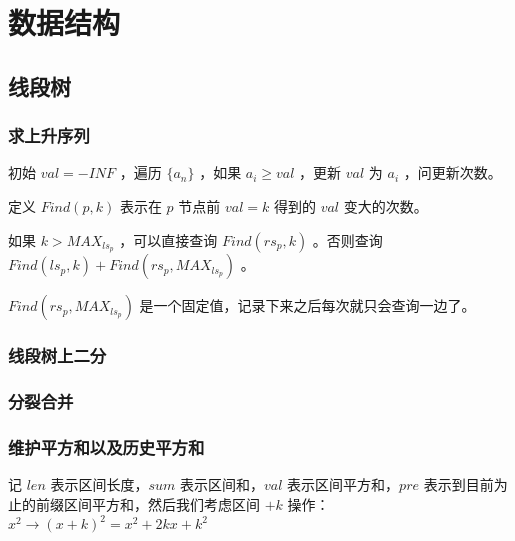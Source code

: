 \section{数据结构}


\subsection{线段树}

\subsubsection{求上升序列}

初始 $val=-INF$ ，遍历 $\{a_n\}$ ，如果 $a_i\ge val$ ，更新 $val$ 为 $a_i$ ，问更新次数。

定义 $Find(p,k)$ 表示在 $p$ 节点前 $val=k$ 得到的 $val$ 变大的次数。

如果 $k>MAX_{ls_p}$ ，可以直接查询 $Find(rs_p,k)$ 。否则查询 $Find(ls_p,k)+Find(rs_p,MAX_{ls_p})$ 。

$Find(rs_p,MAX_{ls_p})$ 是一个固定值，记录下来之后每次就只会查询一边了。



\vspace{-0.5cm}

\subsubsection{线段树上二分}

\vspace{-0.2cm}



\subsubsection{分裂合并}



\vspace{-0.3cm}

\subsubsection{维护平方和以及历史平方和}

记 $len$ 表示区间长度，$sum$ 表示区间和，$val$ 表示区间平方和，$pre$ 表示到目前为止的前缀区间平方和，然后我们考虑区间 $+k$ 操作：
$x^2\to(x+k)^2=x^2+2kx+k^2$

